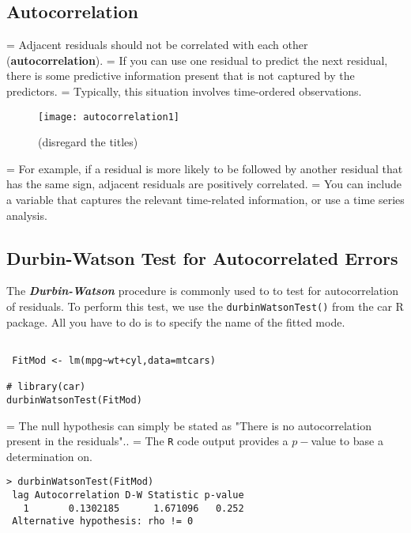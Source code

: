 \documentclass[residuals.tex]{subfiles}
\begin{document}
\subsection*{Autocorrelation} 
\begin{itemize}
 =  Adjacent residuals should not be correlated with each other (\textbf{autocorrelation}). 
 =  If you can use one residual to predict the next residual, there is some predictive information present that is not captured by the predictors. 
 =  Typically, this situation involves time-ordered observations. 
\end{itemize}

\begin{figure}[h!]
\centering
\texttt{[image: autocorrelation1]}
\caption{(disregard the titles)}

\end{figure}
\begin{itemize}
 =  For example, if a residual is more likely to be followed by another residual that has the same sign, adjacent residuals are positively correlated. 
 =  You can include a variable that captures the relevant time-related information, or use a time series analysis.
\end{itemize}
 
\newpage
\subsection*{Durbin-Watson Test for Autocorrelated Errors}
The \textbf{\textit{Durbin-Watson} }procedure is commonly used to to test for autocorrelation of residuals. To perform this test, we use the \texttt{durbinWatsonTest()} from the car R package. All you have to do is to specify the name of the fitted mode.

\begin{framed}
\begin{verbatim}

 FitMod <- lm(mpg~wt+cyl,data=mtcars)

# library(car)
durbinWatsonTest(FitMod)

\end{verbatim}
\end{framed}
\begin{itemize}
 =  The null hypothesis can simply be stated as "There is no autocorrelation present in the residuals".. 
 =  The \texttt{R} code output provides a $p-$value to base a determination on.
\end{itemize}

\begin{framed}
\begin{verbatim}
> durbinWatsonTest(FitMod)
 lag Autocorrelation D-W Statistic p-value
   1       0.1302185      1.671096   0.252
 Alternative hypothesis: rho != 0
\end{verbatim}
\end{framed}

\end{document}

